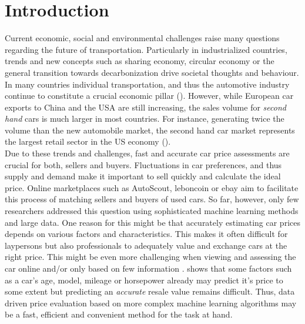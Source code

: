 \documentclass[12pt]{article}
\begin{document}
\renewcommand{\contentsname}{Table of contents}\tableofcontents

\newpage


\section{Introduction}
Current economic, social and environmental challenges raise many questions regarding the future of transportation. Particularly in industrialized countries, trends and new concepts such as sharing economy, circular economy or the general transition towards decarbonization drive societal thoughts and behaviour. In many countries individual transportation, and thus the automotive industry continue to constitute a crucial economic pillar (\cite{huang2023dvmcar}). However, while European car exports to China and the USA are still increasing, the sales volume for \textit{second hand} cars is much larger in most countries. For instance, generating twice the volume than the new automobile market, the second hand car market represents the largest retail sector in the US economy (\cite{Celik2019}). \\


\noindent Due to these trends and challenges, fast and accurate car price assessments are crucial for both, sellers and buyers. Fluctuations in car preferences, and thus supply and demand make it important to sell quickly and calculate the ideal price. Online marketplaces such as AutoScout, leboncoin or ebay aim to facilitate this process of matching sellers and buyers of used cars. So far, however, only few researchers addressed this question using sophisticated machine learning methods and large data. One reason for this might be that accurately estimating car prices depends on various factors and characteristics. This makes it often difficult for laypersons but also professionals to adequately value and exchange cars at the right price. This might be even more challenging when viewing and assessing the car online and/or only based on few information \cite{Bilen2021}. \cite{Pudaruth2014} shows that some factors such as a car's age, model, mileage or horsepower already may predict it's price to some extent but predicting an \textit{accurate} resale value remains difficult. Thus, data driven price evaluation based on more complex machine learning algorithms may be a fast, efficient and convenient method for the task at hand.\\
\end{document}
